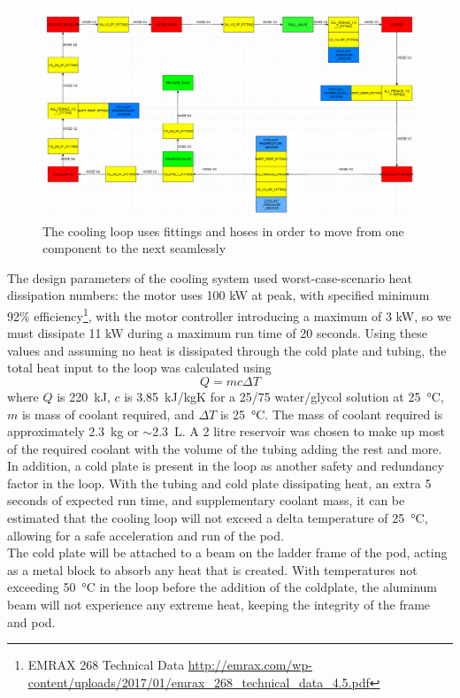 \documentclass[main.tex]{subfiles}
\begin{document}
    \begin{figure}
        \centering
        \includegraphics[width=\linewidth]{images/fig18}
        \caption{The cooling loop uses fittings and hoses in order to move from one component to the next seamlessly}
        \label{fig:cooling-loop}
    \end{figure}
    The design parameters of the cooling system used worst-case-scenario heat dissipation numbers: the motor uses 100 kW at peak, with specified minimum 92\% efficiency\footnote{EMRAX 268 Technical Data \url{http://emrax.com/wp-content/uploads/2017/01/emrax_268_technical_data_4.5.pdf}}, with the motor controller introducing a maximum of 3 kW,  so we must dissipate 11 kW during a maximum run time of 20 seconds. Using these values and assuming no heat is dissipated through the cold plate and tubing, the total heat input to the loop was calculated using
    \[
    Q = mc \Delta T
    \]
    where $Q$ is \SI{220}{kJ}, $c$ is \SI{3.85}{kJ/kgK} for a 25/75 water/glycol solution at \SI{25}{\celsius}, $m$ is mass of coolant required, and $\Delta T$ is \SI{25}{\celsius}. The mass of coolant required is approximately \SI{2.3}{kg} or $\sim$\SI{2.3}{L}. A 2 litre reservoir was chosen to make up most of the required coolant with the volume of the tubing adding the rest and more. In addition, a cold plate is present in the loop as another safety and redundancy factor in the loop. With the tubing and cold plate dissipating heat, an extra 5 seconds of expected run time, and supplementary coolant mass, it can be estimated that the cooling loop will not exceed a delta temperature of \SI{25}{\celsius}, allowing for a safe acceleration and run of the pod.\\

    The cold plate will be attached to a beam on the ladder frame of the pod, acting as a metal block to absorb any heat that is created. With temperatures not exceeding \SI{50}{\celsius} in the loop before the addition of the coldplate, the aluminum beam will not experience any extreme heat, keeping the integrity of the frame and pod.
\end{document}
